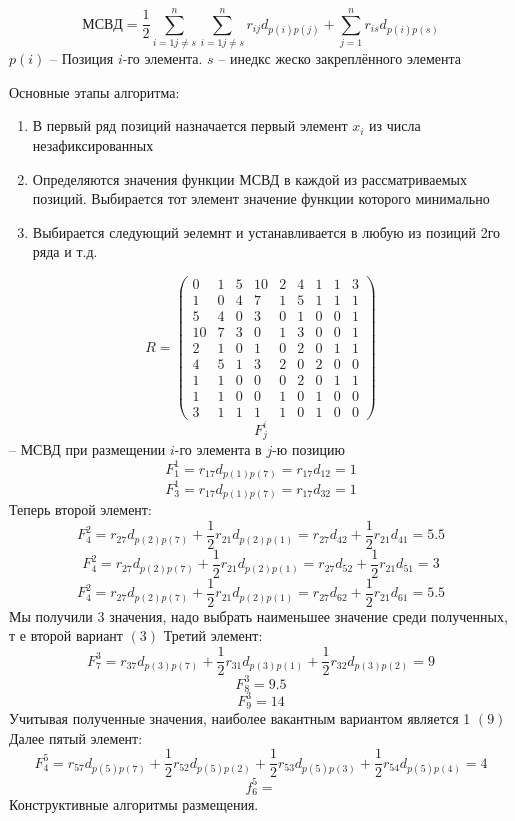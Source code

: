 \documentclass{article}
\begin{document}
	$$
	МСВД = \frac{1}{2} \sum\limits_{i = 1 j \ne s}^{n}\sum\limits_{i = 1 j \ne s}^{n} r_{ij} d_{p(i) p (j)} + \sum\limits_{j=1}^{n} r_{is} d_{p(i) p(s)}
	$$
	$p(i)$ -- Позиция $i$-го элемента. $s$ -- инедкс жеско закреплённого элемента

	Основные этапы алгоритма:
	\begin{enumerate}
		\item В первый ряд позиций назначается первый элемент $x_i$ из числа незафиксированных
		\item Определяются значения функции МСВД в каждой из рассматриваемых позиций. Выбирается тот элемент значение функции которого минимально
		\item Выбирается следующий эелемнт и устанавливается в любую из позиций 2го ряда
		и т.д.
	\end{enumerate}

	$$
	R =
	\begin{pmatrix}
		0 & 1 & 5 & 10 & 2 & 4 & 1 & 1 & 3\\
		1 & 0 & 4 & 7 & 1 & 5 & 1 & 1 & 1 \\
		5 & 4 & 0 & 3 & 0 & 1 & 0 & 0 & 1\\
		10 & 7 & 3 & 0 & 1 & 3 & 0 & 0 & 1\\
		2 & 1 & 0 & 1 & 0 & 2 & 0 & 1 & 1\\
		4 & 5 & 1 & 3 & 2 & 0 & 2 & 0 & 0\\
		1 & 1 & 0 & 0 & 0 & 2 & 0 & 1 & 1\\
		1 & 1 & 0 & 0 & 1 & 0 & 1 & 0 & 0\\
		3 & 1 & 1 & 1 & 1 & 0 & 1 & 0 & 0
	\end{pmatrix}
	$$
	$$
	F_j^i
	$$ -- МСВД при размещении $i$-го элемента в $j$-ю позицию
	$$
	F_1^1 = r_{17}d_{p(1) p(7)} = r_{17} d_{12} = 1
	$$
	$$
	F_3^1 = r_{17}d_{p(1) p(7)} = r_{17}d_{32} = 1
	$$
	Теперь второй элемент:
	$$
	F_4^2 = r_{27}d_{p(2) p(7)} + \frac{1}{2}  r_{21} d_{p(2) p(1)} = r_{27}d_{42} + \frac{1}{2} r_{21} d_{41} = 5.5
	$$
	$$
	F_4^2 = r_{27}d_{p(2) p(7)} + \frac{1}{2}  r_{21} d_{p(2) p(1)} = r_{27} d_{52} + \frac{1}{2} r_{21} d_{51} = 3
	$$
	$$
	F_4^2 = r_{27}d_{p(2) p(7)} + \frac{1}{2}  r_{21} d_{p(2) p(1)} = r_{27} d_{62} + \frac{1}{2} r_{21} d_{61} = 5.5
	$$
	Мы получили 3 значения, надо выбрать наименьшее значение среди полученных, т е второй вариант $(3)$
	Третий элемент:
	$$
	F_7^3 = r_{37} d_{p(3) p(7)} + \frac{1}{2} r_{31}d_{p(3) p(1)} + \frac{1}{2}  r_{32} d_{p(3) p(2)} = 9
	$$
	$$
	F_8^3 = 9.5
	$$
	$$
	F_9^3 = 14
	$$
	Учитывая полученные значения, наиболее вакантным вариантом является 1 $(9)$
	Далее пятый элемент:
	$$
	F_4^5 = r_{57} d_{p(5)p(7)} + \frac{1}{2} r_{52} d_{p(5) p (2)} + \frac{1}{2} r_{53} d_{p(5) p(3)} + \frac{1}{2} r_{54} d_{p(5) p(4)} = 4
	$$
	$$
	f_6^5 = 
	$$
	Конструктивные алгоритмы размещения.
\end{document}
